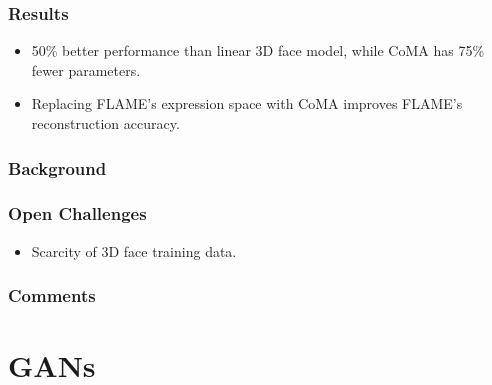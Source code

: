 \documentclass[a4paper, 12pt]{article}
\begin{document}
\subsubsection{Results}

\begin{itemize}
\item 50\% better performance than linear 3D face model, while CoMA has 75\%
        fewer parameters.

\item Replacing FLAME's expression space with CoMA improves FLAME's
        reconstruction accuracy.
\end{itemize}


\subsubsection{Background}


\subsubsection{Open Challenges}

\begin{itemize}
\item Scarcity of 3D face training data.
\end{itemize}


\subsubsection{Comments}


\section{GANs}


%
%
%
%
%
%
%
%
%
%
%
%
%
%
%
%
%
%
%
%
%
%
\end{document}
